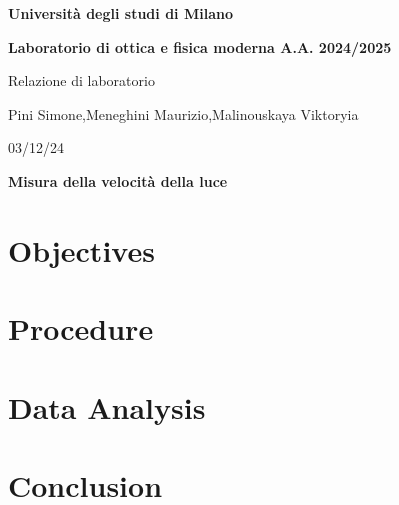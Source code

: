 \documentclass[12pt]{article}
\begin{document}
\begin{center}
    \textbf{Università degli studi di Milano}
    \par { \textbf{Laboratorio di ottica e fisica moderna A.A. 2024/2025}}
    \vspace{7pt}
    \par{Relazione di laboratorio}
    \par{Pini Simone,Meneghini Maurizio,Malinouskaya Viktoryia}
    \par 03/12/24
    \vspace{15pt}
    \par{\textbf{\Large Misura della velocità della luce}}
\end{center}
    



\section{Objectives}


\section{Procedure}


\section{Data Analysis}


\section{Conclusion}

\end{document}
